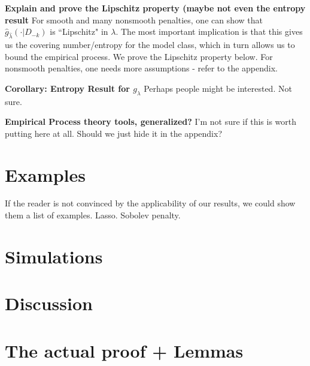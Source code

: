 \documentclass[12pt]{article}
\begin{document}
\textbf{Explain and prove the Lipschitz property (maybe not even the entropy result}
For smooth and many nonsmooth penalties, one can show that $\hat{g}_{\hat \lambda}(\cdot|D_{-k})$ is ``Lipschitz" in $\lambda$.  The most important implication is that this gives us the covering number/entropy for the model class, which in turn allows us to bound the empirical process. We prove the Lipschitz property below. For nonsmooth penalties, one needs more assumptions - refer to the appendix.

\textbf{Corollary: Entropy Result for $g_\lambda$}
Perhaps people might be interested. Not sure.

\textbf{Empirical Process theory tools, generalized?}
I'm not sure if this is worth putting here at all. Should we just hide it in the appendix?

\section{Examples}
If the reader is not convinced by the applicability of our results, we could show them a list of examples. Lasso. Sobolev penalty.

\section{Simulations}

\section{Discussion}

\section{The actual proof + Lemmas}

\bigskip
\end{document}
